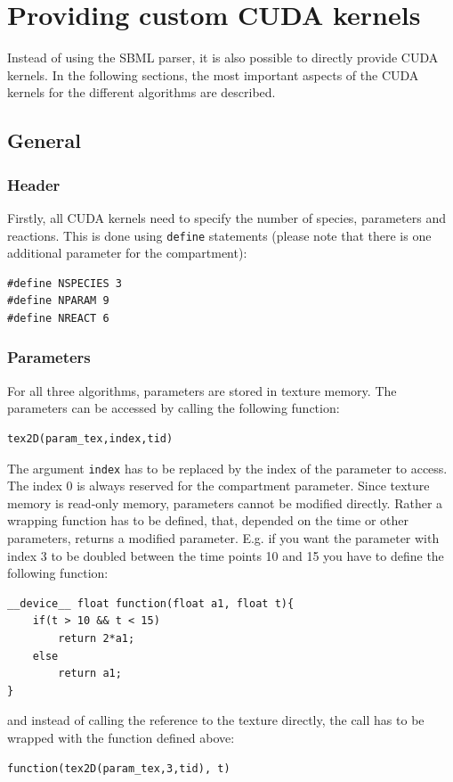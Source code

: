 \documentclass [11pt, a4paper, openany, twoside=off] {article}
\begin{document}
\newpage
\section{Providing custom CUDA kernels}
Instead of using the SBML parser, it is also possible to directly provide CUDA kernels. In the following sections, the most important aspects of the CUDA kernels for the different algorithms are described.
\subsection{General}
\subsubsection{Header}
Firstly, all CUDA kernels need to specify the number of species, parameters and reactions. This is done using \verb$define$ statements (please note that there is one additional parameter for the compartment):
\begin{verbatim}
#define NSPECIES 3
#define NPARAM 9
#define NREACT 6
\end{verbatim}

\subsubsection{Parameters}
For all three algorithms, parameters are stored in texture memory. The parameters can be accessed by calling the following function:
\begin{verbatim}
tex2D(param_tex,index,tid)
\end{verbatim}
The argument \verb$index$ has to be replaced by the index of the parameter to access. The index 0 is always reserved for the compartment parameter. Since texture memory is read-only memory, parameters cannot be modified directly. Rather a wrapping function has to be defined, that, depended on the time or other parameters, returns a modified parameter. E.g. if you want the parameter with index 3 to be doubled between the time points 10 and 15 you have to define the following function:
\begin{verbatim}
__device__ float function(float a1, float t){
    if(t > 10 && t < 15)
        return 2*a1;
    else
        return a1;
}
\end{verbatim}
and instead of calling the reference to the texture directly, the call has to be wrapped with the function defined above:
\begin{verbatim}
function(tex2D(param_tex,3,tid), t)
\end{verbatim}
\end{document}
